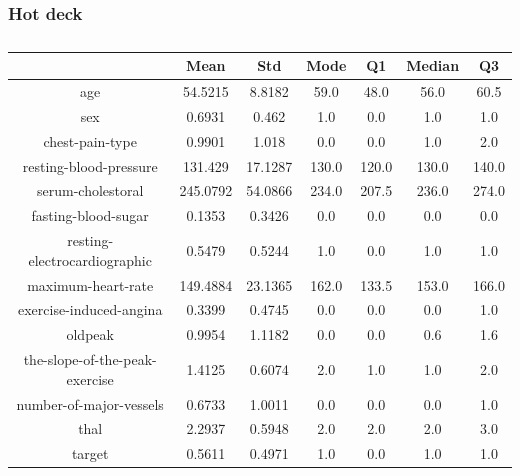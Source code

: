 \documentclass{classrep}
\begin{document}
{{            \subsubsection{Hot deck}
            \label{results:5-percent:dot-deck} {
                \begin{table}[!htbp]
                    \centering
                    \begin{tabular}{|c|c|c|c|c|c|c|}
                        \hline
                        & Mean & Std & Mode & Q1 & Median & Q3 \\ \hline
                        age & 54.5215 & 8.8182 & 59.0 & 48.0 & 56.0 & 60.5 \\ \hline
                        sex & 0.6931 & 0.462 & 1.0 & 0.0 & 1.0 & 1.0 \\ \hline
                        chest-pain-type & 0.9901 & 1.018 & 0.0 & 0.0 & 1.0 & 2.0 \\ \hline
                        resting-blood-pressure & 131.429 & 17.1287 & 130.0 & 120.0 & 130.0 & 140.0 \\ \hline
                        serum-cholestoral & 245.0792 & 54.0866 & 234.0 & 207.5 & 236.0 & 274.0 \\ \hline
                        fasting-blood-sugar & 0.1353 & 0.3426 & 0.0 & 0.0 & 0.0 & 0.0 \\ \hline
                        resting-electrocardiographic & 0.5479 & 0.5244 & 1.0 & 0.0 & 1.0 & 1.0 \\ \hline
                        maximum-heart-rate & 149.4884 & 23.1365 & 162.0 & 133.5 & 153.0 & 166.0 \\ \hline
                        exercise-induced-angina & 0.3399 & 0.4745 & 0.0 & 0.0 & 0.0 & 1.0 \\ \hline
                        oldpeak & 0.9954 & 1.1182 & 0.0 & 0.0 & 0.6 & 1.6 \\ \hline
                        the-slope-of-the-peak-exercise & 1.4125 & 0.6074 & 2.0 & 1.0 & 1.0 & 2.0 \\ \hline
                        number-of-major-vessels & 0.6733 & 1.0011 & 0.0 & 0.0 & 0.0 & 1.0 \\ \hline
                        thal & 2.2937 & 0.5948 & 2.0 & 2.0 & 2.0 & 3.0 \\ \hline
                        target & 0.5611 & 0.4971 & 1.0 & 0.0 & 1.0 & 1.0 \\ \hline
                    \end{tabular}
                    \caption{}
                    \label{result_5_Hot-deck}
                \end{table}
                \FloatBarrier

}}}
\end{document}
